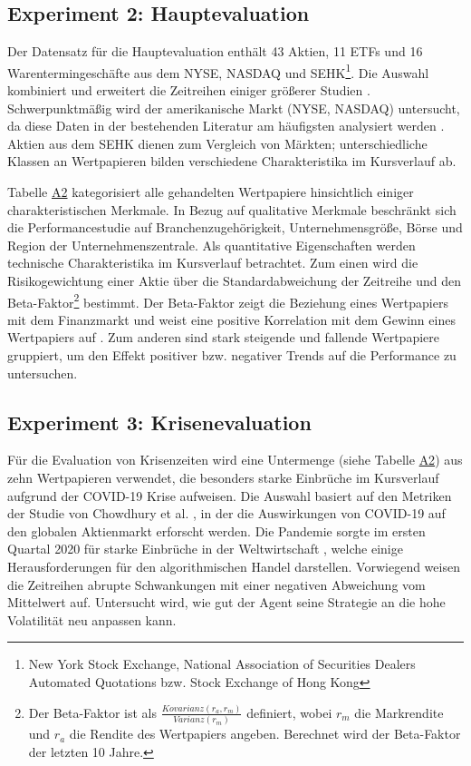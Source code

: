 \subsection{Experiment 2: Hauptevaluation}
\label{subsec:experiment12}

Der Datensatz für die Hauptevaluation enthält 43 Aktien, 11 \acs{ETF}s und 16 Warentermingeschäfte aus dem NYSE, NASDAQ und SEHK\footnote{New York Stock Exchange, National Association of Securities Dealers Automated Quotations bzw. Stock Exchange of Hong Kong}. Die Auswahl kombiniert und erweitert die Zeitreihen einiger größerer Studien \parencites{théate2020application,zhang2019deep,duel}.
Schwerpunktmäßig wird der amerikanische Markt (NYSE, NASDAQ) untersucht, da diese Daten in der bestehenden Literatur am häufigsten analysiert werden \parencite{metausa}.
Aktien aus dem SEHK dienen zum Vergleich von Märkten; unterschiedliche Klassen an Wertpapieren bilden verschiedene Charakteristika im Kursverlauf ab.

Tabelle \hyperref[tabe2]{A2} kategorisiert alle gehandelten Wertpapiere hinsichtlich einiger charakteristischen Merkmale.
In Bezug auf qualitative Merkmale beschränkt sich die Performancestudie auf Branchenzugehörigkeit, Unternehmensgröße, Börse und Region der Unternehmenszentrale.
Als quantitative Eigenschaften werden technische Charakteristika im Kursverlauf betrachtet. Zum einen wird die Risikogewichtung einer Aktie über die Standardabweichung der Zeitreihe und den Beta-Faktor\footnote{Der Beta-Faktor ist als $\frac{Kovarianz(r_a,r_m)}{Varianz(r_m)}$ definiert, wobei $r_m$ die Markrendite und $r_a$ die Rendite des Wertpapiers angeben. Berechnet wird der Beta-Faktor der letzten 10 Jahre.} bestimmt. Der Beta-Faktor zeigt die Beziehung eines Wertpapiers mit dem Finanzmarkt und weist eine positive Korrelation mit dem Gewinn eines Wertpapiers auf \parencite{beta}. Zum anderen sind stark steigende und fallende Wertpapiere gruppiert, um den Effekt positiver bzw. negativer Trends auf die Performance zu untersuchen.

\subsection{Experiment 3: Krisenevaluation}
\label{subsec:experiment3}

Für die Evaluation von Krisenzeiten wird eine Untermenge (siehe Tabelle \hyperref[tabe2]{A2}) aus zehn Wertpapieren verwendet, die besonders starke Einbrüche im Kursverlauf aufgrund der COVID-19 Krise aufweisen. Die Auswahl basiert auf den Metriken der Studie von Chowdhury et al. \parencite{coronawhichbad}, in der die Auswirkungen von COVID-19 auf den globalen Aktienmarkt erforscht werden.
Die Pandemie sorgte im ersten Quartal 2020 für starke Einbrüche in der Weltwirtschaft \parencite{covid19}, welche einige Herausforderungen für den algorithmischen Handel darstellen.
Vorwiegend weisen die Zeitreihen abrupte Schwankungen mit einer negativen Abweichung vom Mittelwert auf.
Untersucht wird, wie gut der Agent seine Strategie an die hohe Volatilität neu anpassen kann.

